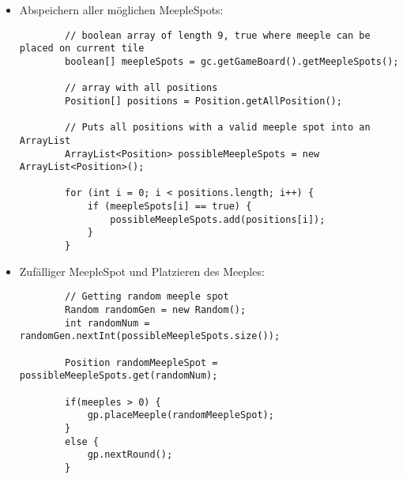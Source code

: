 \begin{itemize}
\begin{itemize}
	\item Abspeichern aller möglichen MeepleSpots:
	\begin{lstlisting}
		// boolean array of length 9, true where meeple can be placed on current tile
		boolean[] meepleSpots = gc.getGameBoard().getMeepleSpots();
		
		// array with all positions
		Position[] positions = Position.getAllPosition();
		
		// Puts all positions with a valid meeple spot into an ArrayList
		ArrayList<Position> possibleMeepleSpots = new ArrayList<Position>();
		
		for (int i = 0; i < positions.length; i++) {
			if (meepleSpots[i] == true) {
				possibleMeepleSpots.add(positions[i]);
			}
		}
	\end{lstlisting}
	
	\item Zufälliger MeepleSpot und Platzieren des Meeples:
	\begin{lstlisting}
		// Getting random meeple spot
		Random randomGen = new Random();
		int randomNum = randomGen.nextInt(possibleMeepleSpots.size());
		
		Position randomMeepleSpot = possibleMeepleSpots.get(randomNum);
		
		if(meeples > 0) {
			gp.placeMeeple(randomMeepleSpot);
		}
		else {
			gp.nextRound();
		}
	\end{lstlisting}
	
	\end{itemize}

\end{itemize}



